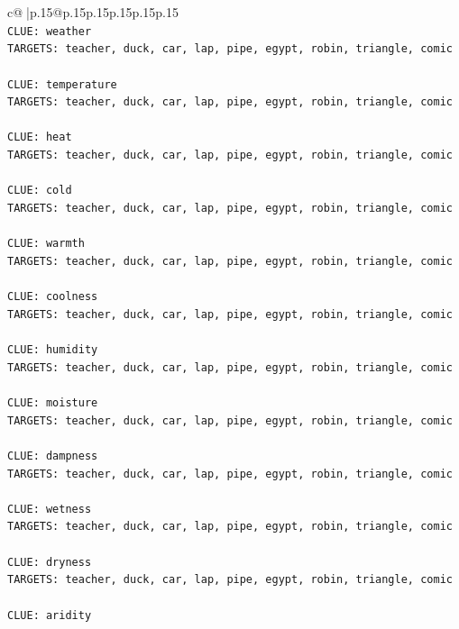 \documentclass{article}
\begin{document}
{\begin{supertabular}{c@{$\;$}|p{.15\linewidth}@{}p{.15\linewidth}p{.15\linewidth}p{.15\linewidth}p{.15\linewidth}p{.15\linewidth}}
{{{\\ 
\texttt{CLUE: weather} \\
\texttt{TARGETS: teacher, duck, car, lap, pipe, egypt, robin, triangle, comic} \\
\\ 
\texttt{CLUE: temperature} \\
\texttt{TARGETS: teacher, duck, car, lap, pipe, egypt, robin, triangle, comic} \\
\\ 
\texttt{CLUE: heat} \\
\texttt{TARGETS: teacher, duck, car, lap, pipe, egypt, robin, triangle, comic} \\
\\ 
\texttt{CLUE: cold} \\
\texttt{TARGETS: teacher, duck, car, lap, pipe, egypt, robin, triangle, comic} \\
\\ 
\texttt{CLUE: warmth} \\
\texttt{TARGETS: teacher, duck, car, lap, pipe, egypt, robin, triangle, comic} \\
\\ 
\texttt{CLUE: coolness} \\
\texttt{TARGETS: teacher, duck, car, lap, pipe, egypt, robin, triangle, comic} \\
\\ 
\texttt{CLUE: humidity} \\
\texttt{TARGETS: teacher, duck, car, lap, pipe, egypt, robin, triangle, comic} \\
\\ 
\texttt{CLUE: moisture} \\
\texttt{TARGETS: teacher, duck, car, lap, pipe, egypt, robin, triangle, comic} \\
\\ 
\texttt{CLUE: dampness} \\
\texttt{TARGETS: teacher, duck, car, lap, pipe, egypt, robin, triangle, comic} \\
\\ 
\texttt{CLUE: wetness} \\
\texttt{TARGETS: teacher, duck, car, lap, pipe, egypt, robin, triangle, comic} \\
\\ 
\texttt{CLUE: dryness} \\
\texttt{TARGETS: teacher, duck, car, lap, pipe, egypt, robin, triangle, comic} \\
\\ 
\texttt{CLUE: aridity} \\
}}}
\end{supertabular}}
\end{document}
